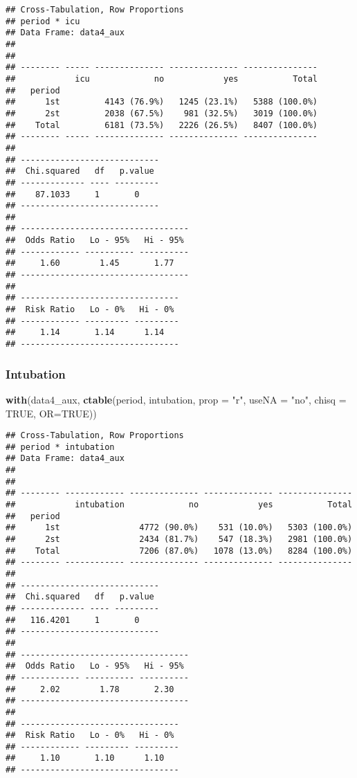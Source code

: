 \documentclass[
]{article}
\newenvironment{Shaded}{\begin{snugshade}}{\end{snugshade}}
\newcommand{\DataTypeTok}[1]{\textcolor[rgb]{0.13,0.29,0.53}{#1}}
\newcommand{\KeywordTok}[1]{\textcolor[rgb]{0.13,0.29,0.53}{\textbf{#1}}}
\newcommand{\NormalTok}[1]{#1}
\newcommand{\OtherTok}[1]{\textcolor[rgb]{0.56,0.35,0.01}{#1}}
\newcommand{\StringTok}[1]{\textcolor[rgb]{0.31,0.60,0.02}{#1}}
\begin{document}
\begin{verbatim}
## Cross-Tabulation, Row Proportions  
## period * icu  
## Data Frame: data4_aux  
## 
## 
## -------- ----- -------------- -------------- ---------------
##            icu             no            yes           Total
##   period                                                    
##      1st         4143 (76.9%)   1245 (23.1%)   5388 (100.0%)
##      2st         2038 (67.5%)    981 (32.5%)   3019 (100.0%)
##    Total         6181 (73.5%)   2226 (26.5%)   8407 (100.0%)
## -------- ----- -------------- -------------- ---------------
## 
## ----------------------------
##  Chi.squared   df   p.value 
## ------------- ---- ---------
##    87.1033     1       0    
## ----------------------------
## 
## ----------------------------------
##  Odds Ratio   Lo - 95%   Hi - 95% 
## ------------ ---------- ----------
##     1.60        1.45       1.77   
## ----------------------------------
## 
## --------------------------------
##  Risk Ratio   Lo - 0%   Hi - 0% 
## ------------ --------- ---------
##     1.14       1.14      1.14   
## --------------------------------
\end{verbatim}

\hypertarget{intubation-2}{%
\subsubsection{Intubation}\label{intubation-2}}

\begin{Shaded}
\begin{Highlighting}[]
\KeywordTok{with}\NormalTok{(data4_aux, }\KeywordTok{ctable}\NormalTok{(period, intubation, }\DataTypeTok{prop =} \StringTok{"r"}\NormalTok{, }\DataTypeTok{useNA =} \StringTok{"no"}\NormalTok{, }\DataTypeTok{chisq =} \OtherTok{TRUE}\NormalTok{, }\DataTypeTok{OR=}\OtherTok{TRUE}\NormalTok{))}
\end{Highlighting}
\end{Shaded}

\begin{verbatim}
## Cross-Tabulation, Row Proportions  
## period * intubation  
## Data Frame: data4_aux  
## 
## 
## -------- ------------ -------------- -------------- ---------------
##            intubation             no            yes           Total
##   period                                                           
##      1st                4772 (90.0%)    531 (10.0%)   5303 (100.0%)
##      2st                2434 (81.7%)    547 (18.3%)   2981 (100.0%)
##    Total                7206 (87.0%)   1078 (13.0%)   8284 (100.0%)
## -------- ------------ -------------- -------------- ---------------
## 
## ----------------------------
##  Chi.squared   df   p.value 
## ------------- ---- ---------
##   116.4201     1       0    
## ----------------------------
## 
## ----------------------------------
##  Odds Ratio   Lo - 95%   Hi - 95% 
## ------------ ---------- ----------
##     2.02        1.78       2.30   
## ----------------------------------
## 
## --------------------------------
##  Risk Ratio   Lo - 0%   Hi - 0% 
## ------------ --------- ---------
##     1.10       1.10      1.10   
## --------------------------------
\end{verbatim}
\end{document}

